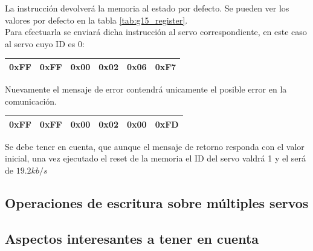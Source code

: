 		La instrucción  devolverá la memoria al estado por defecto. Se pueden ver los valores por defecto en la tabla \ref{tab:g15_register}.
		\\
		
		Para efectuarla se enviará dicha instrucción al servo correspondiente, en este caso al servo cuyo ID es 0:
		\begin{center}
			\begin{tabular}{|c|c|c|c|c|c|}
				\hline
				0xFF & 0xFF & 0x00 & 0x02 & 0x06 & 0xF7 \\
				\hline
			\end{tabular}
		\end{center}
		
		 Nuevamente el mensaje de error contendrá unicamente el posible error en la comunicación.
		 \begin{center}
		 	\begin{tabular}{|c|c|c|c|c|c|}
		 		\hline
		 		0xFF & 0xFF & 0x00 & 0x02 & 0x00 & 0xFD \\
		 		\hline
		 	\end{tabular}
		 \end{center}
		 
		 Se debe tener en cuenta, que aunque el mensaje de retorno responda con el valor inicial, una vez ejecutado el reset de la memoria el ID del servo valdrá 1 y el  será de $19.2kb/s$
	
	\subsection{Operaciones de escritura sobre múltiples servos}
	
	\subsection{Aspectos interesantes a tener en cuenta}

